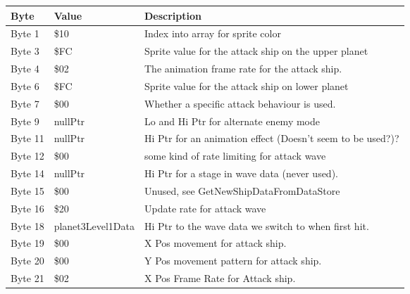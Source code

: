 \begin{figure}[H]
  {
  \setlength{\tabcolsep}{3.0pt}
  \setlength\cmidrulewidth{\heavyrulewidth} %
  \begin{adjustbox}{width=12cm}

\begin{tabular}{lll}
\toprule
 Byte    & Value             & Description                                                        \\
\midrule
 Byte 1  & \$10               & Index into array for sprite color                                  \\
 Byte 3  & \$FC               & Sprite value for the attack ship on the upper planet               \\
 Byte 4  & \$02               & The animation frame rate for the attack ship.                      \\
 Byte 6  & \$FC               & Sprite value for the attack ship on lower planet                   \\
 Byte 7  & \$00               & Whether a specific attack behaviour is used.                       \\
 Byte 9  & nullPtr           & Lo and Hi Ptr for alternate enemy mode                             \\
 Byte 11 & nullPtr           & Hi Ptr for an animation effect (Doesn't seem to be used?)?         \\
 Byte 12 & \$00               & some kind of rate limiting for attack wave                         \\
 Byte 14 & nullPtr           & Hi Ptr for a stage in wave data (never used).                      \\
 Byte 15 & \$00               & Unused, see GetNewShipDataFromDataStore                            \\
 Byte 16 & \$20               & Update rate for attack wave                                        \\
 Byte 18 & planet3Level1Data & Hi Ptr to the wave data we switch to when first hit.               \\
 Byte 19 & \$00               & X Pos movement for attack ship.                                    \\
 Byte 20 & \$00               & Y Pos movement pattern for attack ship.                            \\
 Byte 21 & \$02               & X Pos Frame Rate for Attack ship.                                  \\

\end{tabular}
\end{adjustbox}}
\end{figure}
